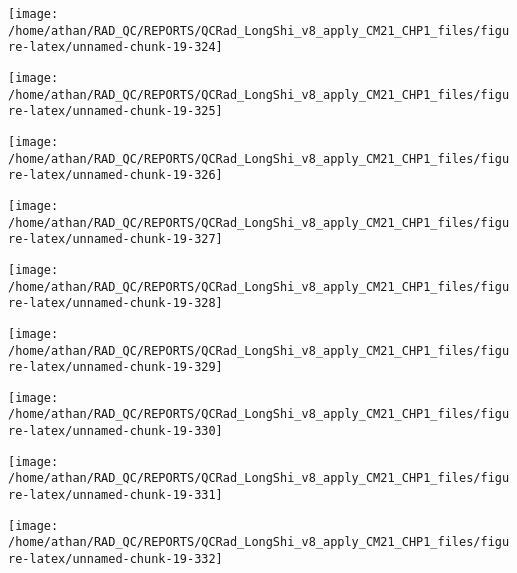 \documentclass[
  10pt,
  a4paper,oneside]{article}
\begin{document}
\begin{center}\texttt{[image: /home/athan/RAD\_QC/REPORTS/QCRad\_LongShi\_v8\_apply\_CM21\_CHP1\_files/figure-latex/unnamed-chunk-19-324]} \end{center}

\begin{center}\texttt{[image: /home/athan/RAD\_QC/REPORTS/QCRad\_LongShi\_v8\_apply\_CM21\_CHP1\_files/figure-latex/unnamed-chunk-19-325]} \end{center}

\begin{center}\texttt{[image: /home/athan/RAD\_QC/REPORTS/QCRad\_LongShi\_v8\_apply\_CM21\_CHP1\_files/figure-latex/unnamed-chunk-19-326]} \end{center}

\begin{center}\texttt{[image: /home/athan/RAD\_QC/REPORTS/QCRad\_LongShi\_v8\_apply\_CM21\_CHP1\_files/figure-latex/unnamed-chunk-19-327]} \end{center}

\begin{center}\texttt{[image: /home/athan/RAD\_QC/REPORTS/QCRad\_LongShi\_v8\_apply\_CM21\_CHP1\_files/figure-latex/unnamed-chunk-19-328]} \end{center}

\begin{center}\texttt{[image: /home/athan/RAD\_QC/REPORTS/QCRad\_LongShi\_v8\_apply\_CM21\_CHP1\_files/figure-latex/unnamed-chunk-19-329]} \end{center}

\begin{center}\texttt{[image: /home/athan/RAD\_QC/REPORTS/QCRad\_LongShi\_v8\_apply\_CM21\_CHP1\_files/figure-latex/unnamed-chunk-19-330]} \end{center}

\begin{center}\texttt{[image: /home/athan/RAD\_QC/REPORTS/QCRad\_LongShi\_v8\_apply\_CM21\_CHP1\_files/figure-latex/unnamed-chunk-19-331]} \end{center}

\begin{center}\texttt{[image: /home/athan/RAD\_QC/REPORTS/QCRad\_LongShi\_v8\_apply\_CM21\_CHP1\_files/figure-latex/unnamed-chunk-19-332]} \end{center}
\end{document}
